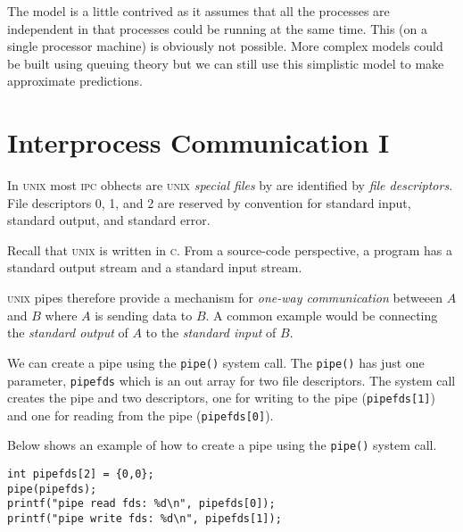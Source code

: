 The model is a little contrived as it assumes that all the processes are independent in that processes 
could be running at the same time. This (on a single processor machine) is obviously not possible. 
More complex models could be built using queuing theory but we can still use this simplistic model 
to make approximate predictions. 



\section{Interprocess Communication I}





In \textsc{unix} most \textsc{ipc} obhects are \textsc{unix} \textit{special files} by 
are identified by \textit{file descriptors}. 
File descriptors 0, 1, and 2 are reserved by convention 
for standard input, standard output, and standard error.

Recall that \textsc{unix} is written in \textsc{c}. From a source-code perspective, 
a program has a standard output stream and a standard input stream. 


\textsc{unix} pipes therefore provide a mechanism
for \textit{one-way communication} betweeen $A$ and $B$ where 
$A$ is sending data to $B$. A common example would be 
connecting the \textit{standard output} of $A$ 
to the \textit{standard input} of $B$.

We can create a pipe using the \lstinline{pipe()} system call.
The \lstinline{pipe()} has just one parameter, \lstinline{pipefds} 
which is an out array for two file descriptors. 
The system call creates the pipe and two descriptors, 
one for writing to the pipe (\lstinline{pipefds[1]}) 
and one for reading from the pipe (\lstinline{pipefds[0]}). 

\frmrule

\begin{example}
Below shows an example of how to create a pipe 
using the \lstinline{pipe()} system call.

\begin{lstlisting}
int pipefds[2] = {0,0};
pipe(pipefds);
printf("pipe read fds: %d\n", pipefds[0]);
printf("pipe write fds: %d\n", pipefds[1]);
\end{lstlisting}
\end{example}


